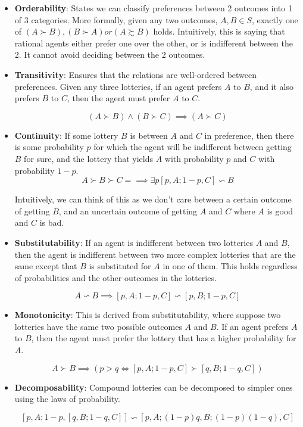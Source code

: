 \documentclass[11pt]{article}
\begin{document}
\begin{itemize}
    \item \textbf{Orderability}: States we can classify preferences between 2 outcomes into 1 of 3 categories. More formally, given any two outcomes, $A, B \in S$, exactly one of $(A \succ B), (B \succ A) or (A \succsim B)$ holds. Intuitively, this is saying that rational agents either prefer one over the other, or is indifferent between the 2. It cannot avoid deciding between the 2 outcomes.
    \item \textbf{Transitivity}: Ensures that the relations are well-ordered between preferences. Given any three lotteries, if an agent prefers $A$ to $B$, and it also prefers $B$ to $C$, then the agent must prefer $A$ to $C$.
    
    $$
    (A \succ B) \land (B \succ C) \implies (A \succ C)
    $$
    \item \textbf{Continuity}: If some lottery $B$ is between $A$ and $C$ in preference, then there is some probability $p$ for which the agent will be indifferent between getting $B$ for sure, and the lottery that yields $A$ with probability $p$ and $C$ with probability $1-p$.
    $$
    A \succ B \succ C = \implies \exists p [p, A; 1-p, C] \backsim B
    $$
    
    Intuitively, we can think of this as we don't care between a certain outcome of getting $B$, and an uncertain outcome of getting $A$ and $C$ where $A$ is good and $C$ is bad.
    \item \textbf{Substitutability}: If an agent is indifferent between two lotteries $A$ and $B$, then the agent is indifferent between two more complex lotteries that are the same except that $B$ is substituted for $A$ in one of them. This holds regardless of probabilities and the other outcomes in the lotteries.
    
    $$
    A \backsim B \implies [p, A; 1-p, C] \backsim [p, B; 1-p, C]
    $$
    \item \textbf{Monotonicity}: This is derived from substitutability, where suppose two lotteries have the same two possible outcomes $A$ and $B$. If an agent prefers $A$ to $B$, then the agent must prefer the lottery that has a higher probability for $A$.
    
    $$
    A \succ B \implies (p > q \iff [p, A; 1-p, C] \succ [q, B; 1-q, C])
    $$
    \item \textbf{Decomposability}: Compound lotteries can be decomposed to simpler ones using the laws of probability.
    
    $$
    [p, A; 1-p,[q, B; 1-q, C]] \backsim [p, A; (1-p)q, B; (1-p)(1-q), C]
    $$
\end{itemize}
\end{document}
